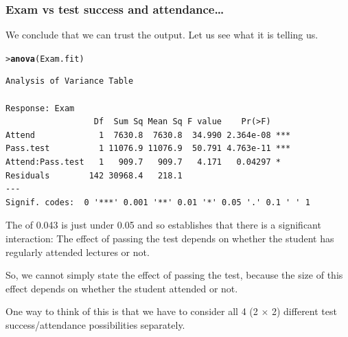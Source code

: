 \documentclass{beamer}\usepackage[]{graphicx}\usepackage[]{xcolor}
\makeatletter
\newcommand{\hlstd}[1]{\textcolor[rgb]{0.345,0.345,0.345}{#1}}%
\newcommand{\hlkwd}[1]{\textcolor[rgb]{0.737,0.353,0.396}{\textbf{#1}}}%
\newenvironment{kframe}{%
 \def\at@end@of@kframe{}%
 \ifinner\ifhmode%
  \def\at@end@of@kframe{\end{minipage}}%
  \begin{minipage}{\columnwidth}%
 \fi\fi%
 \def\FrameCommand##1{\hskip\@totalleftmargin \hskip-\fboxsep
 \colorbox{shadecolor}{##1}\hskip-\fboxsep
     \hskip-\linewidth \hskip-\@totalleftmargin \hskip\columnwidth}%
 \MakeFramed {\advance\hsize-\width
   \@totalleftmargin\z@ \linewidth\hsize
   \@setminipage}}%
 {\par\unskip\endMakeFramed%
 \at@end@of@kframe}
\newenvironment{knitrout}{}{} %
\makeatother
\begin{document}
\begin{frame}[fragile]
\frametitle{Exam vs test success and attendance\ldots}
We conclude that we can trust the output. Let us see what it is telling us.

\begin{knitrout}\scriptsize
{}\color{fgcolor}\begin{kframe}
\begin{alltt}
\hlstd{> }\hlkwd{anova}\hlstd{(Exam.fit)}
\end{alltt}
\begin{verbatim}
Analysis of Variance Table

Response: Exam
                  Df  Sum Sq Mean Sq F value    Pr(>F)    
Attend             1  7630.8  7630.8  34.990 2.364e-08 ***
Pass.test          1 11076.9 11076.9  50.791 4.763e-11 ***
Attend:Pass.test   1   909.7   909.7   4.171   0.04297 *  
Residuals        142 30968.4   218.1                      
---
Signif. codes:  0 '***' 0.001 '**' 0.01 '*' 0.05 '.' 0.1 ' ' 1
\end{verbatim}
\end{kframe}
\end{knitrout}
\smallskip

The \pval{} of 0.043 is just under 0.05 and so establishes that there is a significant interaction: The effect of passing the test depends on whether the student has regularly attended lectures or not.
\smallskip

So, we cannot simply state the effect of passing the test, because the size of this effect depends on whether the student attended or not.
\smallskip

One way to think of this is that we have to consider all 4 (2 $\times$ 2) different test success/attendance possibilities separately.
\end{frame}


\end{document}
